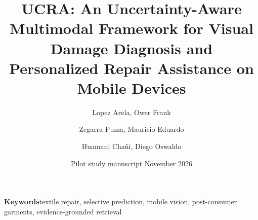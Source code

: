 \documentclass[11pt]{article}
\title{\textbf{UCRA: An Uncertainty-Aware Multimodal Framework for Visual Damage Diagnosis and Personalized Repair Assistance on Mobile Devices}}
\author{Lopez Arela, Ower Frank \and Zegarra Puma, Mauricio Eduardo \and Huamani Cha\~ni, Diego Oswaldo}
\date{Pilot study manuscript \enspace\textbullet\enspace November 2026}
\begin{document}
\maketitle

\smallskip
\textbf{Keywords}\quad textile repair, selective prediction, mobile vision, post-consumer garments, evidence-grounded retrieval



\clearpage





\end{document}
